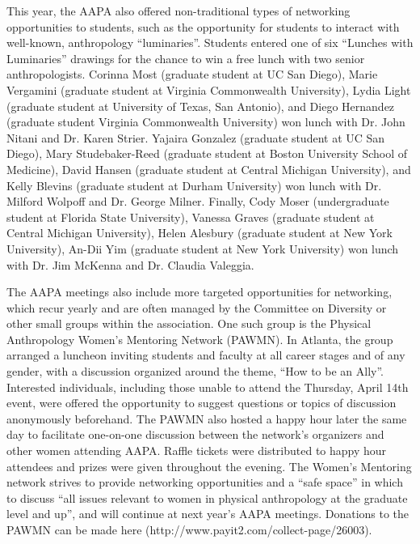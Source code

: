 \documentclass[english]{ijsra}
\begin{document}
This year, the AAPA also offered non-traditional types of networking opportunities to students,
such as the opportunity for students to interact with well-known, anthropology “luminaries”. 
Students entered one of six “Lunches with Luminaries” drawings for the chance to win a free lunch with two senior anthropologists. 
Corinna Most (graduate student at UC San Diego), Marie Vergamini (graduate student at Virginia Commonwealth University),
Lydia Light (graduate student at University of Texas, San Antonio),
and Diego Hernandez (graduate student Virginia Commonwealth University) won lunch with Dr. John Nitani and Dr. Karen Strier. 
Yajaira Gonzalez (graduate student at UC San Diego), Mary Studebaker-Reed (graduate student at Boston University School of Medicine),
David Hansen (graduate student at Central Michigan University), 
and Kelly Blevins (graduate student at Durham University) won lunch with Dr. Milford Wolpoff and Dr. George Milner.
Finally, Cody Moser (undergraduate student at Florida State University), 
Vanessa Graves (graduate student at Central Michigan University), 
Helen Alesbury (graduate student at New York University), An-Dii Yim (graduate student at New York University) won lunch with
Dr. Jim McKenna  and Dr. Claudia Valeggia.%

The AAPA meetings also include more targeted opportunities for networking, 
which recur yearly and are often managed by the Committee on Diversity or other small groups within the association.
One such group is the Physical Anthropology Women’s Mentoring Network (PAWMN).  
In Atlanta, the group arranged a luncheon inviting students and faculty at all career stages and of any gender,
with a discussion organized around the theme, “How to be an Ally”. 
Interested individuals, including those unable to attend the Thursday, April 14th event, 
were offered the opportunity to suggest questions or topics of discussion anonymously beforehand.
The PAWMN also hosted a happy hour later the same day to facilitate one-on-one discussion between the network's organizers and other women attending AAPA.
Raffle tickets were distributed to happy hour attendees and prizes were given throughout the evening.
The Women’s Mentoring network strives to provide networking opportunities and a “safe space” in which to 
discuss “all issues relevant to women in physical anthropology at the graduate level and up”,
and will continue at next year’s AAPA meetings.
Donations to the PAWMN can be made here (http://www.payit2.com/collect-page/26003).%
\end{document}
